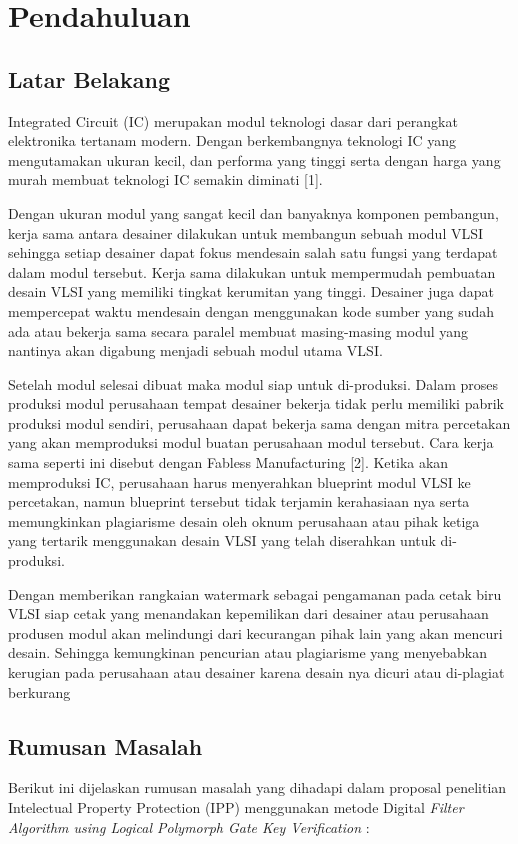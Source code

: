 \chapter{Pendahuluan}
\section{Latar Belakang}

Integrated Circuit (IC) merupakan modul teknologi dasar dari perangkat elektronika tertanam modern. Dengan berkembangnya teknologi IC yang mengutamakan ukuran kecil, dan performa yang tinggi serta dengan harga yang murah membuat teknologi IC semakin diminati [1].

Dengan ukuran modul yang sangat kecil dan banyaknya komponen
pembangun, kerja sama antara desainer dilakukan untuk membangun sebuah modul VLSI sehingga setiap desainer dapat fokus mendesain salah satu fungsi yang terdapat dalam modul tersebut. Kerja sama dilakukan untuk mempermudah pembuatan desain VLSI yang memiliki tingkat kerumitan yang tinggi. Desainer juga dapat mempercepat waktu mendesain dengan menggunakan kode sumber yang sudah ada atau bekerja sama secara paralel membuat masing-masing modul yang nantinya akan digabung menjadi sebuah modul utama VLSI.

Setelah modul selesai dibuat maka modul siap untuk di-produksi. Dalam proses produksi modul perusahaan tempat desainer bekerja tidak perlu memiliki pabrik produksi modul sendiri, perusahaan dapat bekerja sama dengan mitra percetakan yang akan memproduksi modul buatan perusahaan modul tersebut. Cara kerja sama seperti ini disebut dengan Fabless Manufacturing [2]. Ketika akan memproduksi IC, perusahaan harus menyerahkan blueprint modul VLSI ke percetakan, namun blueprint tersebut tidak terjamin kerahasiaan nya serta memungkinkan plagiarisme desain oleh oknum perusahaan atau pihak ketiga yang tertarik menggunakan desain VLSI yang telah diserahkan untuk di-produksi.

Dengan memberikan rangkaian watermark sebagai pengamanan pada cetak biru VLSI siap cetak yang menandakan kepemilikan dari desainer atau perusahaan produsen modul akan melindungi dari kecurangan pihak lain yang akan mencuri desain. Sehingga kemungkinan pencurian atau plagiarisme yang menyebabkan kerugian pada perusahaan atau desainer karena desain nya dicuri atau di-plagiat berkurang

\section{Rumusan Masalah}
Berikut ini dijelaskan rumusan masalah yang dihadapi dalam proposal penelitian Intelectual Property Protection (IPP) menggunakan metode Digital \textit{Filter Algorithm using Logical Polymorph Gate Key Verification} :
